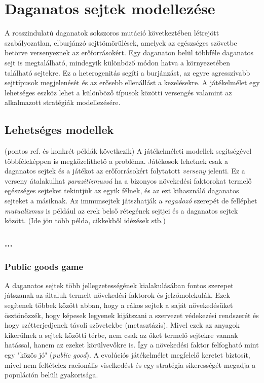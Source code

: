 \section{Daganatos sejtek modellezése}
A rosszindulatú daganatok sokszoros mutáció következtében létrejött szabályozatlan, elburjánzó sejttömörülések, amelyek az egészséges szövetbe betörve versenyeznek az erőforrásokért. Egy daganaton belül többféle daganatos sejt is megtalálható, mindegyik különböző módon hatva a környezetében található sejtekre. Ez a heterogenitás segíti a burjánzást, az egyre agresszívabb sejttípusok megjelenését és az erősebb ellenállást a kezelésekre. A játékelmélet egy lehetséges eszköz lehet a különböző típusok közötti versengés valamint az alkalmazott stratégiák modellezésére.

\subsection{Lehetséges modellek}
(pontos ref. és konkrét példák következik)
A játékelméleti modellek segítségével többféleképpen is megközelíthető a probléma. Játékosok lehetnek csak a daganatos sejtek és a játékot az erőforrásokért folytatott \textit{verseny} jelenti. Ez a verseny átalakulhat \textit{parazitizmussá} ha a bizonyos növekedési faktorokat termelő egészséges sejteket tekintjük az egyik félnek, és az ezt kihasználó daganatos sejteket a másiknak. Az immunsejtek játszhatják a \textit{ragadozó} szerepét de felléphet \textit{mutualizmus} is például az erek belső rétegének sejtjei és a daganatos sejtek között. 
(Ide jön több példa, cikkekből idézések stb.)
\subsubsection{...}
\subsubsection{Public goods game}
A daganatos sejtek több jellegzetességének kialakulásában fontos szerepet játszanak az általuk termelt növekedési faktorok és jelzőmolekulák. Ezek segítenek többek között abban, hogy a rákos sejtek a saját növekedésüket ösztönözzék, hogy képesek legyenek kijátszani a szervezet védekezési rendszerét és hogy szétterjedjenek távoli szövetekbe (metasztázis). Mivel ezek az anyagok kikerülnek a sejtek közötti térbe, nem csak az őket termelő sejtekre vannak hatással, hanem az ezeket körülvevőkre is. Így a növekedési faktor felfogható mint egy "közös jó" (\textit{public good}). A evolúciós játékelmélet megfelelő keretet biztosít, mivel nem feltételez racionális viselkedést és egy stratégia sikerességét megadja a populáción belüli gyakorisága\cite{archetti2016cooperation}.

